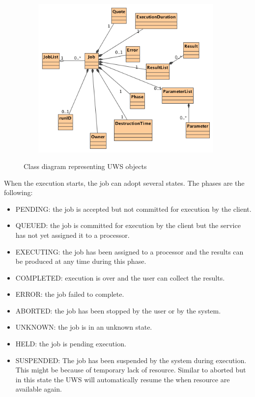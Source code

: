 \begin{figure}[H]
\centering
\includegraphics[width=11cm,height=8cm]{images/Class_Diagram__UWS__UWSObjects.png}\\
\caption{Class diagram representing UWS objects}
\end{figure}

When the execution starts, the job can adopt several states. The phases are the following:

\begin{itemize}

\item 
    PENDING: the job is accepted but not committed for execution by the client.
\item
    QUEUED: the job is committed for execution by the client but the service has not yet assigned it to a processor.
\item
    EXECUTING: the job has been assigned to a processor and the results can be produced at any time during this phase.
\item
    COMPLETED: execution is over and the user can collect the results.
\item
    ERROR: the job failed to complete.
\item
    ABORTED: the job has been stopped by the user or by the system.
\item
    UNKNOWN: the job is in an unknown state.
\item
    HELD: the job is pending execution.
\item
    SUSPENDED: The job has been suspended by the system during execution. This might be because of temporary lack of resource. Similar to aborted but in this state the UWS will automatically resume the when resource are available again.

\end{itemize}



